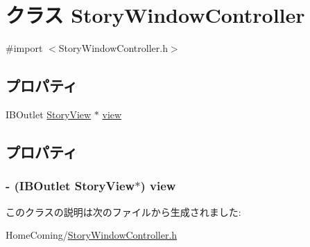 \hypertarget{interface_story_window_controller}{\section{クラス Story\-Window\-Controller}
\label{interface_story_window_controller}
}


{\ttfamily \#import $<$Story\-Window\-Controller.\-h$>$}

\subsection*{プロパティ}
\begin{DoxyCompactItemize}
\item 
I\-B\-Outlet \hyperlink{interface_story_view}{Story\-View} $\ast$ \hyperlink{interface_story_window_controller_a85b1027b0de036041ca28cddfa887a23}{view}
\end{DoxyCompactItemize}


\subsection{プロパティ}
\hypertarget{interface_story_window_controller_a85b1027b0de036041ca28cddfa887a23}{
\subsubsection[{view}]{\setlength{\rightskip}{0pt plus 5cm}-\/ (I\-B\-Outlet {\bf Story\-View}$\ast$) {\bf view}}}\label{interface_story_window_controller_a85b1027b0de036041ca28cddfa887a23}


このクラスの説明は次のファイルから生成されました\-:\begin{DoxyCompactItemize}
\item 
Home\-Coming/\hyperlink{_story_window_controller_8h}{Story\-Window\-Controller.\-h}\end{DoxyCompactItemize}
